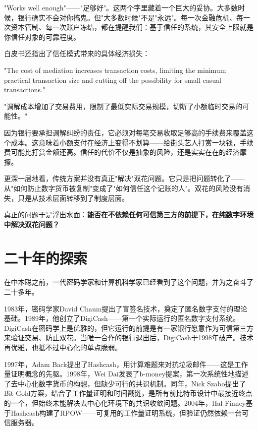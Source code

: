 \documentclass[a4paper,12pt,openany]{ctexbook}
\newenvironment{quoting}{%
  \par\vspace{0.5em}%
  \begin{list}{}{%
    \setlength{\leftmargin}{2em}%
    \setlength{\rightmargin}{2em}%
    \setlength{\parsep}{0.3em}%
    \setlength{\itemsep}{0pt}%
    \setlength{\topsep}{0pt}%
  }%
  \item\relax
}{%
  \end{list}%
  \par\vspace{0.5em}%
}
\begin{document}
"Works well enough"——"足够好"。这两个字里藏着一个巨大的妥协。大多数时候，银行确实不会对你搞鬼。但"大多数时候"不是"永远"。每一次金融危机、每一次资本管制、每一次账户冻结，都在提醒我们：基于信任的系统，其安全上限就是你信任对象的可靠程度。

白皮书还指出了信任模式带来的具体经济损失：


\begin{quoting}
\small
"The cost of mediation increases transaction costs, limiting the minimum practical transaction size and cutting off the possibility for small casual transactions."

"调解成本增加了交易费用，限制了最低实际交易规模，切断了小额临时交易的可能性。"
\end{quoting}


因为银行要承担调解纠纷的责任，它必须对每笔交易收取足够高的手续费来覆盖这个成本。这意味着小额支付在经济上变得不划算——给街头艺人打赏一块钱，手续费可能比打赏金额还高。信任的代价不仅是抽象的风险，还是实实在在的经济摩擦。

更深一层地看，传统方案并没有真正"解决"双花问题。它只是把问题转化了——从"如何防止数字货币被复制"变成了"如何信任这个记账的人"。双花的风险没有消失，只是从技术层面转移到了制度层面。

真正的问题于是浮出水面：\textbf{能否在不依赖任何可信第三方的前提下，在纯数字环境中解决双花问题？}


\section*{二十年的探索}


在中本聪之前，一代密码学家和计算机科学家已经看到了这个问题，并为之奋斗了二十多年。

1983年，密码学家David Chaum提出了盲签名技术，奠定了匿名数字支付的理论基础。1989年，他创立了DigiCash——第一个实际运行的匿名数字支付系统。DigiCash在密码学上是优雅的，但它运行的前提是有一家银行愿意作为可信第三方来验证交易、防止双花。当唯一合作的银行退出后，DigiCash于1998年破产。技术再优雅，也抵不过中心化的单点脆弱。

1997年，Adam Back提出了Hashcash，用计算难题来对抗垃圾邮件——这是工作量证明概念的先驱。1998年，Wei Dai发表了b-money提案，第一次系统性地描述了去中心化数字货币的构想，但缺少可行的共识机制。同年，Nick Szabo提出了Bit Gold方案，结合了工作量证明和时间戳链，是所有前比特币设计中最接近终点的一个，但始终未能解决去中心化环境下的共识收敛问题。2004年，Hal Finney基于Hashcash构建了RPOW——可复用的工作量证明系统，但验证仍然依赖一台可信服务器。
\end{document}

